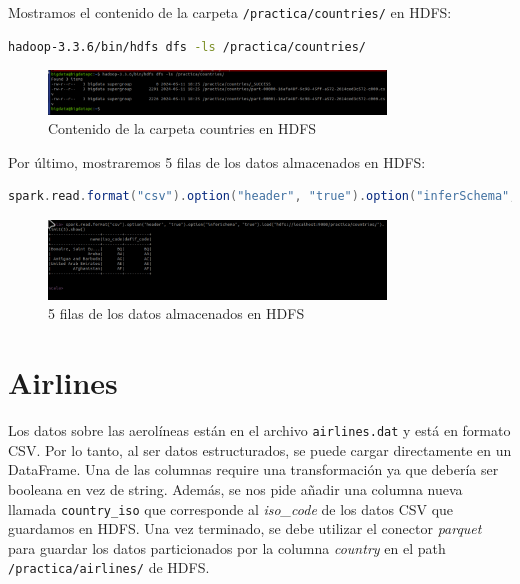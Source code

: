 Mostramos el contenido de la carpeta \texttt{/practica/countries/} en HDFS:

\begin{lstlisting}[language=bash]
hadoop-3.3.6/bin/hdfs dfs -ls /practica/countries/
\end{lstlisting}

\begin{figure}[H]
    \centering
    \includegraphics[width=0.8\textwidth]{figures/31.png}
    \caption{Contenido de la carpeta countries en HDFS}
    \label{fig:countries_hdfs}
\end{figure}

Por último, mostraremos 5 filas de los datos almacenados en HDFS:

\begin{lstlisting}[language=scala]
spark.read.format("csv").option("header", "true").option("inferSchema","true").load("hdfs://localhost:9000/practica/countries/").limit(5).show()
\end{lstlisting}

\begin{figure}[H]
    \centering
    \includegraphics[width=0.8\textwidth]{figures/32.png}
    \caption{5 filas de los datos almacenados en HDFS}
    \label{fig:countries_hdfs_data}
\end{figure}

\section{Airlines}

Los datos sobre las aerolíneas están en el archivo \texttt{airlines.dat} y está en formato CSV. Por lo tanto, al ser datos estructurados, se puede cargar directamente en un DataFrame. Una de las columnas require una transformación ya que debería ser booleana en vez de string. Además, se nos pide añadir una columna nueva llamada \texttt{country_iso} que corresponde al \textit{iso_code} de los datos CSV que guardamos en HDFS. Una vez terminado, se debe utilizar el conector \textit{parquet} para guardar los datos particionados por la columna \textit{country} en el path \texttt{/practica/airlines/} de HDFS.

